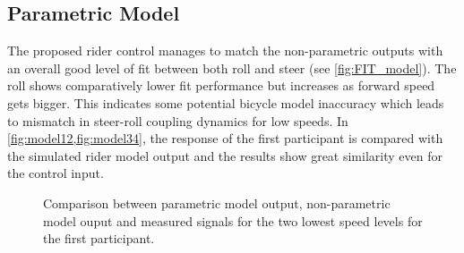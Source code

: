 \subsection{Parametric Model}
The proposed rider control manages to match the non-parametric outputs with an overall good level of fit between both roll and steer (see \cref{fig:FIT_model}). The roll  shows comparatively lower fit performance but increases as forward speed gets bigger. This indicates some potential bicycle model inaccuracy which  leads to mismatch in steer-roll coupling dynamics for low speeds.   In \cref{fig:model12,fig:model34}, the response of the first participant is compared with the simulated rider model output and the results show great similarity even for the control input.
\begin{figure}
    \centering
    \begin{subfigure}[b]{\textwidth}
        \centering
        \caption{}
        \label{fig:model1}
    \end{subfigure}
    \begin{subfigure}[b]{\textwidth}
        \centering
        \caption{}            
        \label{fig:model2}
    \end{subfigure}
    \caption{Comparison between parametric model output, non-parametric model ouput and measured signals for the two lowest speed levels for the first participant.}
    \label{fig:model12}
 \end{figure}
